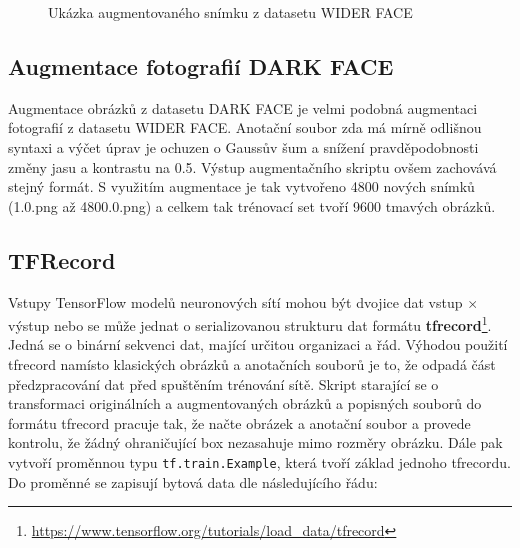 \begin{figure}[H]
  \begin{center}
  \label{obrazek:augmentovanyobrazek}
  \caption{Ukázka augmentovaného snímku z datasetu WIDER FACE}
  \end{center}
\end{figure}

\subsection*{Augmentace fotografií DARK FACE}
Augmentace obrázků z datasetu DARK FACE je velmi podobná augmentaci fotografií z datasetu WIDER FACE. Anotační soubor zda má mírně odlišnou syntaxi a výčet úprav je ochuzen o Gaussův šum a snížení pravděpodobnosti změny jasu a kontrastu na 0.5. Výstup augmentačního skriptu ovšem zachovává stejný formát. S využitím augmentace je tak vytvořeno 4800 nových snímků (1.0.png až 4800.0.png) a celkem tak trénovací set tvoří 9600 tmavých obrázků.

\subsection*{TFRecord}
Vstupy TensorFlow modelů neuronových sítí mohou být dvojice dat vstup $\times$ výstup nebo se může jednat o serializovanou strukturu dat formátu \textbf{tfrecord}\footnote{\url{https://www.tensorflow.org/tutorials/load_data/tfrecord}}. Jedná se o binární sekvenci dat, mající určitou organizaci a řád. Výhodou použití tfrecord namísto klasických obrázků a anotačních souborů je to, že odpadá část předzpracování dat před spuštěním trénování sítě. Skript starající se o transformaci originálních a augmentovaných obrázků a popisných souborů do formátu tfrecord pracuje tak, že načte obrázek a anotační soubor a provede kontrolu, že žádný ohraničující box nezasahuje mimo rozměry obrázku. Dále pak vytvoří proměnnou typu \texttt{tf.train.Example}, která tvoří základ jednoho tfrecordu. Do proměnné se zapisují bytová data dle následujícího řádu:

